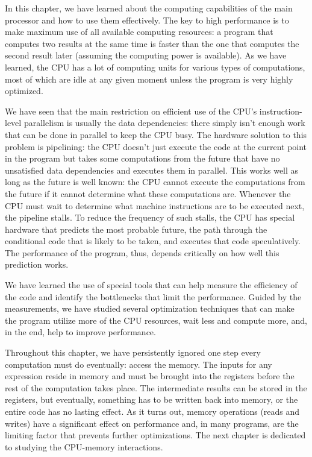 In this chapter, we have learned about the computing capabilities of the main processor and how to use them effectively. The key to high performance is to make maximum use of all available computing resources: a program that computes two results at the same time is faster than the one that computes the second result later (assuming the computing power is available). As we have learned, the CPU has a lot of computing units for various types of computations, most of which are idle at any given moment unless the program is very highly optimized.

We have seen that the main restriction on efficient use of the CPU's instruction-level parallelism is usually the data dependencies: there simply isn't enough work that can be done in parallel to keep the CPU busy. The hardware solution to this problem is pipelining: the CPU doesn't just execute the code at the current point in the program but takes some computations from the future that have no unsatisfied data dependencies and executes them in parallel. This works well as long as the future is well known: the CPU cannot execute the computations from the future if it cannot determine what these computations are. Whenever the CPU must wait to determine what machine instructions are to be executed next, the pipeline stalls. To reduce the frequency of such stalls, the CPU has special hardware that predicts the most probable future, the path through the conditional code that is likely to be taken, and executes that code speculatively. The performance of the program, thus, depends critically on how well this prediction works.

We have learned the use of special tools that can help measure the efficiency of the code and identify the bottlenecks that limit the performance. Guided by the measurements, we have studied several optimization techniques that can make the program utilize more of the CPU resources, wait less and compute more, and, in the end, help to improve performance.

Throughout this chapter, we have persistently ignored one step every computation must do eventually: access the memory. The inputs for any expression reside in memory and must be brought into the registers before the rest of the computation takes place. The intermediate results can be stored in the registers, but eventually, something has to be written back into memory, or the entire code has no lasting effect. As it turns out, memory operations (reads and writes) have a significant effect on performance and, in many programs, are the limiting factor that prevents further optimizations. The next chapter is dedicated to studying the CPU-memory interactions.







